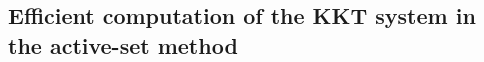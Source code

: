 \documentclass[a4paper,12pt,openany]{book}
\newcommand{\B}{\mathbf{B}}
\newcommand{\norm}[1]{\left\|#1\right\|}
\begin{document}
\begin{appendices}
%

\section{Efficient computation of the KKT system in the active-set method}
\label{app:active_set_kkt}


\end{appendices}
\end{document}
